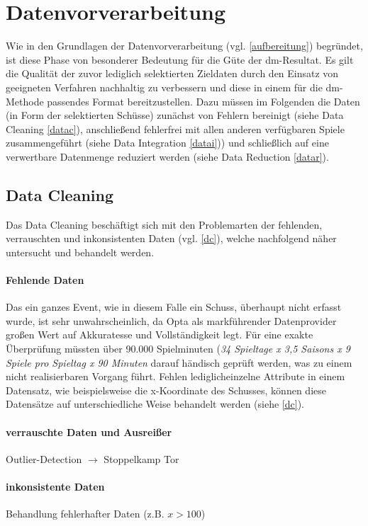 \section{Datenvorverarbeitung}
\label{dv}
Wie in den Grundlagen der Datenvorverarbeitung (vgl. \vref{aufbereitung}) begründet, ist diese Phase von besonderer Bedeutung für die Güte der \gls{dm}-Resultat. Es gilt die Qualität der zuvor lediglich selektierten Zieldaten durch den Einsatz von geeigneten Verfahren nachhaltig zu verbessern und diese in einem für die \gls{dm}-Methode passendes Format bereitzustellen. Dazu müssen im Folgenden die Daten (in Form der selektierten Schüsse) zunächst von Fehlern bereinigt (siehe Data Cleaning \vref{datac}), anschließend fehlerfrei mit allen anderen verfügbaren Spiele zusammengeführt (siehe Data Integration \vref{datai})) und schließlich auf eine verwertbare Datenmenge reduziert werden (siehe Data Reduction \vref{datar}).

\subsection{Data Cleaning}
Das Data Cleaning beschäftigt sich mit den Problemarten der fehlenden, verrauschten und inkonsistenten Daten (vgl. \vref{dc}), welche nachfolgend näher untersucht und behandelt werden. 

\paragraph{Fehlende Daten}
Das ein ganzes Event, wie in diesem Falle ein Schuss, überhaupt nicht erfasst wurde, ist sehr unwahrscheinlich, da Opta als markführender Datenprovider großen Wert auf Akkuratesse und Vollständigkeit legt. Für eine exakte Überprüfung müssten über 90.000 Spielminuten (\textit{34 Spieltage x 3,5 Saisons x 9 Spiele pro Spieltag x 90 Minuten} darauf händisch geprüft werden, was zu einem nicht realisierbaren Vorgang führt. Fehlen \glqq lediglich\grqq einzelne Attribute in einem Datensatz, wie beispielsweise die x-Koordinate des Schusses, können diese Datensätze auf unterschiedliche Weise behandelt werden (siehe \vref{dc}). 



\paragraph{verrauschte Daten und Ausreißer}
Outlier-Detection $\rightarrow$ Stoppelkamp Tor
\paragraph{inkonsistente Daten}
Behandlung fehlerhafter Daten (z.B. $x>100$)

